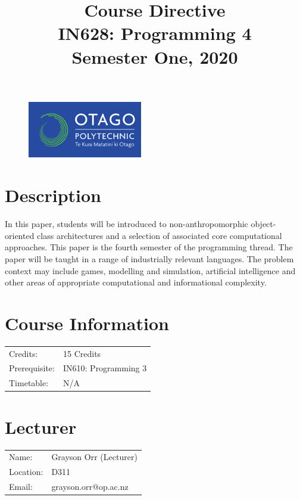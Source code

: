 \documentclass{article}
\author{}
\begin{document}
\begin{figure}
  \includegraphics[width=50mm]{../../resources/img/logo.png}
\end{figure}

\title{Course Directive\\IN628: Programming 4\\Semester One, 2020}
\date{}
\maketitle

\section*{Description}
In this paper, students will be introduced to non-anthropomorphic object-oriented class architectures and a selection of associated core computational approaches. This paper is the fourth semester of the programming thread. The paper will be taught in a range of industrially relevant languages. The problem context may include games, modelling and simulation, artificial intelligence and other areas of appropriate computational and informational complexity.

\section*{Course Information}
\begin{tabular}{ll}
  Credits:      & 15 Credits          \\
  Prerequisite: & IN610: Programming 3 \\
  Timetable:    & N/A                 \\
\end{tabular}

\section*{Lecturer}
\begin{tabular}{ll}
  Name:     & Grayson Orr (Lecturer) \\
  Location: & D311                   \\
  Email:    & grayson.orr@op.ac.nz   \\
\end{tabular}
\end{document}
